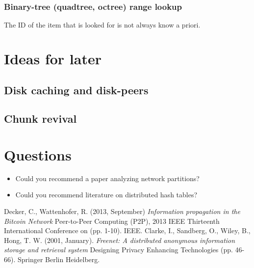 \documentclass{article}
\begin{document}
\subsubsection{Binary-tree (quadtree, octree) range lookup}

The ID of the item that is looked for is not always know a priori.

\section{Ideas for later}

\subsection{Disk caching and disk-peers}

\subsection{Chunk revival}

\section{Questions}

\begin{itemize}
  \itemsep0em
  \item Could you recommend a paper analyzing network partitions?
  \item Could you recommend literature on distributed hash tables?
\end{itemize}

\begin{thebibliography}{9}
   Decker, C., Wattenhofer, R. (2013, September) 
    \emph{Information propagation in the Bitcoin Network} 
    Peer-to-Peer Computing (P2P), 2013 IEEE Thirteenth International Conference
    on (pp. 1-10). IEEE.
   Clarke, I., Sandberg, O., Wiley, B., Hong, T. W. 
    (2001, January). \emph{Freenet: A distributed anonymous information storage
    and retrieval system} Designing Privacy Enhancing Technologies (pp. 46-66).
    Springer Berlin Heidelberg.
\end{thebibliography}
\end{document}
